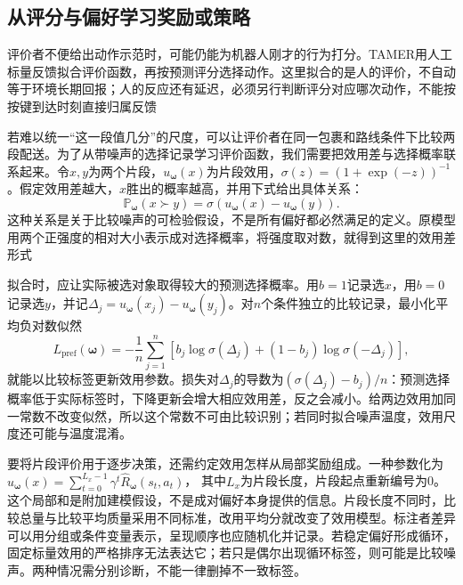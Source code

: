 \subsection{从评分与偏好学习奖励或策略}
\label{sec:rl-reward-preference}

评价者不便给出动作示范时，可能仍能为机器人刚才的行为打分。TAMER用人工标量反馈拟合评价函数，再按预测评分选择动作。这里拟合的是人的评价，不自动等于环境长期回报；人的反应还有延迟，必须另行判断评分对应哪次动作，不能按按键到达时刻直接归属反馈

若难以统一“这一段值几分”的尺度，可以让评价者在同一包裹和路线条件下比较两段配送。为了从带噪声的选择记录学习评价函数，我们需要把效用差与选择概率联系起来。令$x,y$为两个片段，$u_{\bm{\omega}}(x)$为片段效用，$\sigma(z)=(1+\exp(-z))^{-1}$。假定效用差越大，$x$胜出的概率越高，并用下式给出具体关系：
\begin{equation}
  \mathbb P_{\bm{\omega}}(x\succ y)
    =\sigma\!\left(u_{\bm{\omega}}(x)-u_{\bm{\omega}}(y)\right).
  \label{eq:rl-reward-bt}
\end{equation}
这种关系是关于比较噪声的可检验假设，不是所有偏好都必然满足的定义。原模型用两个正强度的相对大小表示成对选择概率，将强度取对数，就得到这里的效用差形式

拟合时，应让实际被选对象取得较大的预测选择概率。用$b=1$记录选$x$，用$b=0$记录选$y$，并记$\Delta_j=u_{\bm{\omega}}(x_j)-u_{\bm{\omega}}(y_j)$。对$n$个条件独立的比较记录，最小化平均负对数似然
\begin{equation}
  L_{\mathrm{pref}}(\bm{\omega})
  =-\frac1n\sum_{j=1}^n
    \left[b_j\log\sigma(\Delta_j)
      +(1-b_j)\log\sigma(-\Delta_j)\right],
  \label{eq:rl-reward-bt-loss}
\end{equation}
就能以比较标签更新效用参数。损失对$\Delta_j$的导数为$(\sigma(\Delta_j)-b_j)/n$：预测选择概率低于实际标签时，下降更新会增大相应效用差，反之会减小。给两边效用加同一常数不改变似然，所以这个常数不可由比较识别；若同时拟合噪声温度，效用尺度还可能与温度混淆。

要将片段评价用于逐步决策，还需约定效用怎样从局部奖励组成。一种参数化为
$u_{\bm{\omega}}(x)=\sum_{t=0}^{L_x-1}\gamma^t
\widehat R_{\bm{\omega}}(s_t,a_t)$，
其中$L_x$为片段长度，片段起点重新编号为0。这个局部和是附加建模假设，不是成对偏好本身提供的信息。片段长度不同时，比较总量与比较平均质量采用不同标准，改用平均分就改变了效用模型。标注者差异可以用分组或条件变量表示，呈现顺序也应随机化并记录。若稳定偏好形成循环，固定标量效用的严格排序无法表达它；若只是偶尔出现循环标签，则可能是比较噪声。两种情况需分别诊断，不能一律删掉不一致标签。

